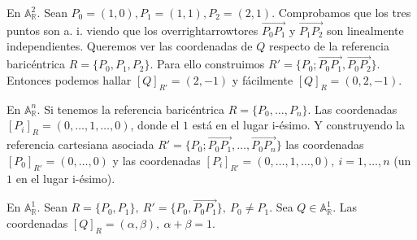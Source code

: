 \documentclass[14pt]{book}
\begin{document}
\begin{ej}
	En $\mathbb{A}_\mathbb{R}^2$. Sean $P_0 = (1,0), P_1 = (1, 1), P_2 = (2, 1)$. Comprobamos que los tres puntos son a. i. viendo que los overrightarrowtores $\overrightarrow{P_0 P_1}$ y $\overrightarrow{P_1 P_2}$ son linealmente independientes. Queremos ver las coordenadas de $Q$ respecto de la referencia baricéntrica $R = \{P_0, P_1, P_2\}$. Para ello construimos $R' = \{P_0; \overrightarrow{P_0 P_1}, \overrightarrow{P_0 P_2} \}$. Entonces podemos hallar $[Q]_{R'} = (2, -1)$ y fácilmente $[Q]_R = (0, 2, -1)$.
\end{ej}

\begin{ej}
	En $\mathbb{A}_\mathbb{R}^n$. Si tenemos la referencia baricéntrica $R = \{P_0, \dots, P_n\}$. Las coordenadas $[P_i]_R = (0, \dots, 1, \dots, 0)$, donde el $1$ está en el lugar i-ésimo. Y construyendo la referencia cartesiana asociada $R' = \{P_0; \overrightarrow{P_0 P_1}, \dots, \overrightarrow{P_0 P_n}\}$ las coordenadas $[P_0]_{R'} = (0, \dots, 0)$ y las coordenadas $[P_i]_{R'} = (0, \dots, 1, \dots, 0),\ i = 1, \dots, n$ (un $1$ en el lugar i-ésimo).
\end{ej}

\begin{ej}
	En $\mathbb{A}_\mathbb{R}^1$. Sean $R = \{P_0, P_1\},\ R' = \{P_0, \overrightarrow{P_0 P_1}\},\ P_0 ≠ P_1$. Sea $Q \in \mathbb{A}_\mathbb{R}^1$. Las coordenadas $[Q]_R = (\alpha, \beta),\ \alpha + \beta = 1$.
	
\end{ej}
\end{document}
